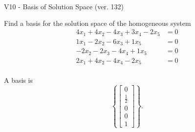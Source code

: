 \begin{exercise}
  \begin{exerciseTitle}V10 - Basis of Solution Space (ver. 132)\end{exerciseTitle}
  \begin{exerciseStatement}
    Find a basis for the solution space of the homogeneous system 
\begin{align*}
 4 x_ 1 + 4 x_ 2 -4 x_ 3 + 3 x_ 4 -2 x_ 5 &= 0  \\ 
  1 x_ 1 -2 x_ 2 -6 x_ 3 + 1 x_ 5 &= 0  \\ 
  -2 x_ 2 -2 x_ 3 -4 x_ 4 + 1 x_ 5 &= 0  \\ 
  2 x_ 1 + 4 x_ 2 -4 x_ 4 -2 x_ 5 &= 0  \\ 
 \end{align*}


 
  \end{exerciseStatement}

  \begin{exerciseAnswer}
   A basis is   
\[\left\{\left[\begin{array}{c}
0 \\
\frac{1}{2} \\
0 \\
0 \\
1
\end{array}\right]\right\}.\]

  


  \end{exerciseAnswer}
\end{exercise}